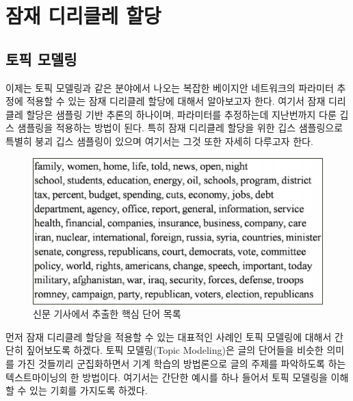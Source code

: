 \documentclass[a4paper]{oblivoir}
\begin{document}
\section{잠재 디리클레 할당}

\subsection{토픽 모델링}

이제는 토픽 모델링과 같은 분야에서 나오는 복잡한 베이지안 네트워크의 파라미터 추정에 적용할 수 있는 잠재 디리클레 할당에 대해서 알아보고자 한다. 여기서 잠재 디리클레 할당은 샘플링 기반 추론의 하나이며, 파라미터를 추정하는데 지난번까지 다룬 깁스 샘플링을 적용하는 방법이 된다. 특히 잠재 디리클레 할당을 위한 깁스 샘플링으로 특별히 붕괴 깁스 샘플링이 있으며 여기서는 그것 또한 자세히 다루고자 한다. \\

\begin{figure}[ht] \centering 
\includegraphics[scale=0.7]{fig10_18.png} 
\caption{신문 기사에서 추출한 핵심 단어 목록}
\label{fig:10-18-1}
\end{figure}

먼저 잠재 디리클레 할당을 적용할 수 있는 대표적인 사례인 토픽 모델링에 대해서 간단히 짚어보도록 하겠다. 토픽 모델링(Topic Modeling)은  글의 단어들을 비슷한 의미를 가진 것들끼리 군집화하면서 기계 학습의 방법론으로 글의 주제를 파악하도록 하는 텍스트마이닝의 한 방법이다. 여기서는 간단한 예시를 하나 들어서 토픽 모델링을 이해할 수 있는 기회를 가지도록 하겠다. \\
\end{document}

